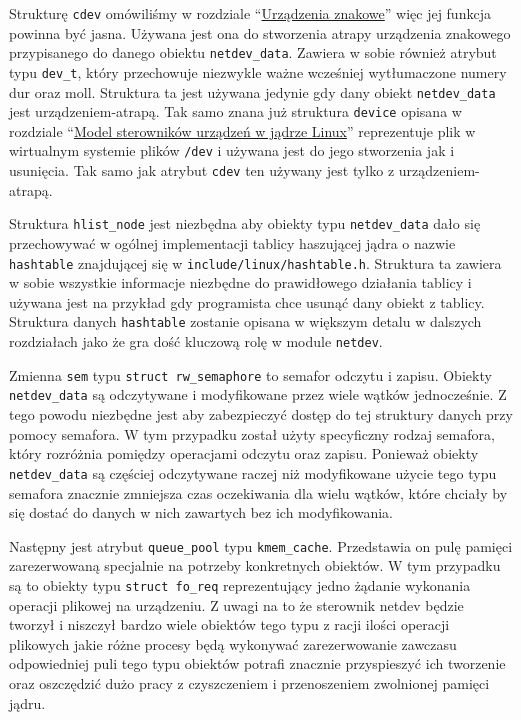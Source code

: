 \documentclass[10pt]{article}
\begin{document}
Strukturę \texttt{cdev} omówiliśmy w rozdziale ``\hyperref[urządzenia-znakowe]{Urządzenia znakowe}'' więc jej funkcja powinna być jasna. Używana jest ona do stworzenia atrapy urządzenia znakowego przypisanego do danego obiektu \texttt{netdev\_data}. Zawiera w sobie również atrybut typu \texttt{dev\_t}, który przechowuje niezwykle ważne wcześniej wytłumaczone numery dur oraz moll. Struktura ta jest używana jedynie gdy dany obiekt \texttt{netdev\_data} jest urządzeniem-atrapą. Tak samo znana już struktura \texttt{device} opisana w rozdziale ``\hyperref[model-sterowników-urządzeń-w-jądrze-linux]{Model sterowników urządzeń w jądrze Linux}'' reprezentuje plik w wirtualnym systemie plików \texttt{/dev} i używana jest do jego stworzenia jak i usunięcia. Tak samo jak atrybut \texttt{cdev} ten używany jest tylko z urządzeniem-atrapą.

Struktura \texttt{hlist\_node} jest niezbędna aby obiekty typu \texttt{netdev\_data} dało się przechowywać w ogólnej implementacji tablicy haszującej jądra o nazwie \texttt{hashtable} znajdującej się w \texttt{include/linux/hashtable.h}. Struktura ta zawiera w sobie wszystkie informacje niezbędne do prawidłowego działania tablicy i używana jest na przykład gdy programista chce usunąć dany obiekt z tablicy. Struktura danych \texttt{hashtable} zostanie opisana w większym detalu w dalszych rozdziałach jako że gra dość kluczową rolę w module \texttt{netdev}.

Zmienna \texttt{sem} typu \texttt{struct rw\_semaphore} to semafor odczytu i zapisu. Obiekty \texttt{netdev\_data} są odczytywane i modyfikowane przez wiele wątków jednocześnie. Z tego powodu niezbędne jest aby zabezpieczyć dostęp do tej struktury danych przy pomocy semafora. W tym przypadku został użyty specyficzny rodzaj semafora, który rozróżnia pomiędzy operacjami odczytu oraz zapisu. Ponieważ obiekty \texttt{netdev\_data} są częściej odczytywane raczej niż modyfikowane użycie tego typu semafora znacznie zmniejsza czas oczekiwania dla wielu wątków, które chciały by się dostać do danych w nich zawartych bez ich modyfikowania.  

Następny jest atrybut \texttt{queue\_pool} typu \texttt{kmem\_cache}.  Przedstawia on pulę pamięci zarezerwowaną specjalnie na potrzeby konkretnych obiektów. W tym przypadku są to obiekty typu \texttt{struct fo\_req} reprezentujący jedno żądanie wykonania operacji plikowej na urządzeniu. Z uwagi na to że sterownik netdev będzie tworzył i niszczył bardzo wiele obiektów tego typu z racji ilości operacji plikowych jakie różne procesy będą wykonywać zarezerwowanie zawczasu odpowiedniej puli tego typu obiektów potrafi znacznie przyspieszyć ich tworzenie oraz oszczędzić dużo pracy z czyszczeniem i przenoszeniem zwolnionej pamięci jądru.
\end{document}
